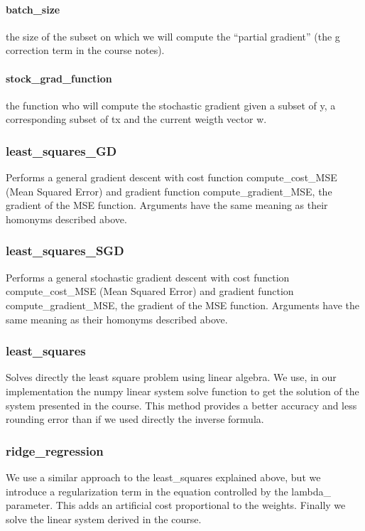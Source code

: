 \documentclass[10pt,conference,compsocconf]{IEEEtran}
\begin{document}
\paragraph{batch\_size} the size of the subset on which we will compute the ``partial gradient'' (the g correction term in the course notes).
\paragraph{stock\_grad\_function} the function who will compute the stochastic gradient given a subset of y, a corresponding subset of tx and the current weigth vector w.

\subsubsection{least\_squares\_GD}
Performs a general gradient descent with cost function compute\_cost\_MSE (Mean Squared Error) and gradient function compute\_gradient\_MSE, the gradient of the MSE function. Arguments have the same meaning as their homonyms described above.

\subsubsection{least\_squares\_SGD}
Performs a general stochastic gradient descent with cost function compute\_cost\_MSE (Mean Squared Error) and gradient function compute\_gradient\_MSE, the gradient of the MSE function. Arguments have the same meaning as their homonyms described above.

\subsubsection{least\_squares}
Solves directly the least square problem using linear algebra. We use, in our implementation the numpy linear system solve function to get the solution of the system presented in the course. This method provides a better accuracy and less rounding error than if we used directly the inverse formula.

\subsubsection{ridge\_regression}
We use a similar approach to the least\_squares explained above, but we introduce a regularization term in the equation controlled by the lambda\_ parameter. This adds an artificial cost proportional to the weights. Finally we solve the linear system derived in the course.
\end{document}
